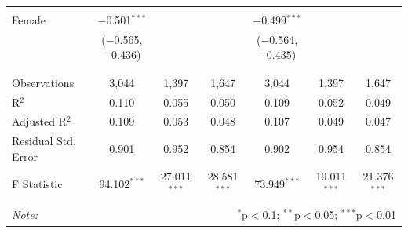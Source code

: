 \documentclass[12pt,a4paper]{article}
\numberwithin{equation}{section}
\begin{document}
\begin{landscape}
\begin{table}[!htbp]
\begin{tabular}{@{\extracolsep{5pt}}lcccccc}
			& & & & & & \\ 
			Female & $-$0.501$^{***}$ &  &  & $-$0.499$^{***}$ &  &  \\ 
			& ($-$0.565, $-$0.436) &  &  & ($-$0.564, $-$0.435) &  &  \\ 
			& & & & & & \\ 
			\hline \\[-1.8ex] 
			Observations & 3,044 & 1,397 & 1,647 & 3,044 & 1,397 & 1,647 \\ 
			R$^{2}$ & 0.110 & 0.055 & 0.050 & 0.109 & 0.052 & 0.049 \\ 
			Adjusted R$^{2}$ & 0.109 & 0.053 & 0.048 & 0.107 & 0.049 & 0.047 \\ 
			Residual Std. Error & 0.901 & 0.952 & 0.854 & 0.902 & 0.954 & 0.854 \\ 
			F Statistic & 94.102$^{***}$ & 27.011$^{***}$ & 28.581$^{***}$ & 73.949$^{***}$ & 19.011$^{***}$ & 21.376$^{***}$ \\ 
			\hline 
			\hline \\[-1.8ex] 
			\textit{Note:}  & \multicolumn{6}{r}{$^{*}$p$<$0.1; $^{**}$p$<$0.05; $^{***}$p$<$0.01} \\ 
		\end{tabular} 
	\end{table} 
	
\end{landscape}

\newpage
\end{document}
